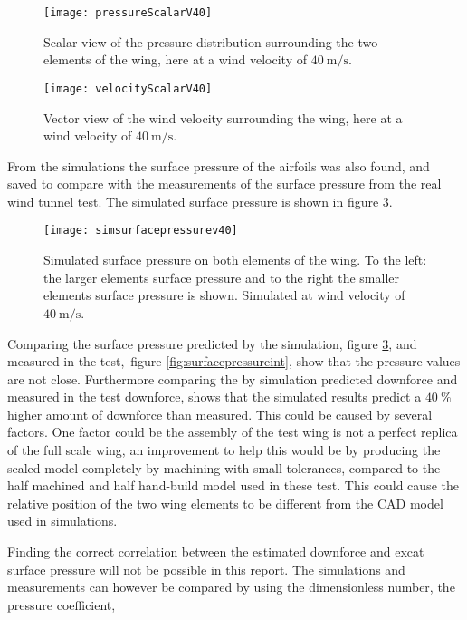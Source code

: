   \begin{figure}
    \texttt{[image: pressureScalarV40]}
    \caption{Scalar view of the pressure distribution surrounding the two elements of the wing, here at a wind velocity of $\SI{40}{\metre\per\second}$.}
    \label{fig:pressureScalarV40}
  \end{figure}

  \begin{figure}
    \texttt{[image: velocityScalarV40]}
    \caption{Vector view of the wind velocity surrounding the wing, here at a wind velocity of $\SI{40}{\metre\per\second}$.}
    \label{fig:velocityScalarV40}
  \end{figure}

  From the simulations the surface pressure of the airfoils was also found, and saved to compare with the measurements of the surface pressure from the real wind tunnel test. The simulated surface pressure is shown in figure \ref{fig:simsurfacepressurev40}.

  \begin{figure}
    \texttt{[image: simsurfacepressurev40]}
    \caption{Simulated surface pressure on both elements of the wing. To the left: the larger elements surface pressure and to the right the smaller elements surface pressure is shown. Simulated at wind velocity of $\SI{40}{\metre\per\second}$.}
    \label{fig:simsurfacepressurev40}
  \end{figure}

  Comparing the surface pressure predicted by the simulation, figure \ref{fig:simsurfacepressurev40}, and measured in the test, figure \ref{fig:surfacepressureint}, show that the pressure values are not close. Furthermore comparing the by simulation predicted downforce and measured in the test downforce, shows that the simulated results predict a $\SI{40}{\%}$ higher amount of downforce than measured. This could be caused by several factors. One factor could be the assembly of the test wing is not a perfect replica of the full scale wing, an improvement to help this would be by producing the scaled model completely by machining with small tolerances, compared to the half machined and half hand-build model used in these test. This could cause the relative position of the two wing elements to be different from the CAD model used in simulations.

  Finding the correct correlation between the estimated downforce and excat surface pressure will not be possible in this report. The simulations and measurements can however be compared by using the dimensionless number, the pressure coefficient,

